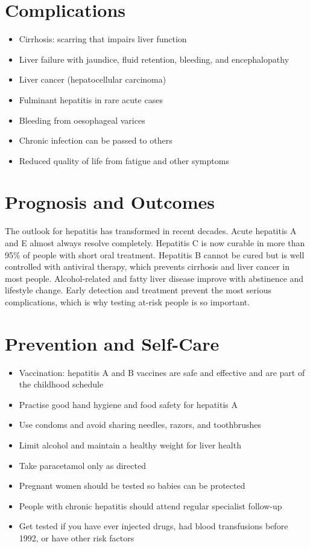 \section*{Complications}
\begin{itemize}
    \item Cirrhosis: scarring that impairs liver function
    \item Liver failure with jaundice, fluid retention, bleeding, and encephalopathy
    \item Liver cancer (hepatocellular carcinoma)
    \item Fulminant hepatitis in rare acute cases
    \item Bleeding from oesophageal varices
    \item Chronic infection can be passed to others
    \item Reduced quality of life from fatigue and other symptoms
\end{itemize}

\section*{Prognosis and Outcomes}
The outlook for hepatitis has transformed in recent decades. Acute hepatitis A and E almost always resolve completely. Hepatitis C is now curable in more than 95\% of people with short oral treatment. Hepatitis B cannot be cured but is well controlled with antiviral therapy, which prevents cirrhosis and liver cancer in most people. Alcohol-related and fatty liver disease improve with abstinence and lifestyle change. Early detection and treatment prevent the most serious complications, which is why testing at-risk people is so important.

\section*{Prevention and Self-Care}
\begin{itemize}
    \item Vaccination: hepatitis A and B vaccines are safe and effective and are part of the childhood schedule
    \item Practise good hand hygiene and food safety for hepatitis A
    \item Use condoms and avoid sharing needles, razors, and toothbrushes
    \item Limit alcohol and maintain a healthy weight for liver health
    \item Take paracetamol only as directed
    \item Pregnant women should be tested so babies can be protected
    \item People with chronic hepatitis should attend regular specialist follow-up
    \item Get tested if you have ever injected drugs, had blood transfusions before 1992, or have other risk factors
\end{itemize}

